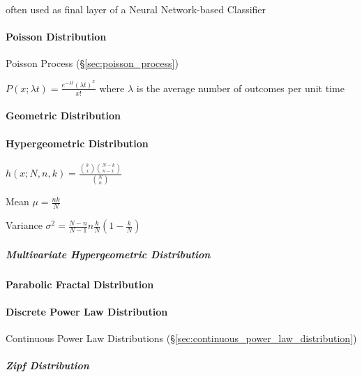 often used as final layer of a Neural Network-based Classifier



\paragraph{Poisson Distribution}\label{sec:poisson_distribution}\hfill

Poisson Process (\S\ref{sec:poisson_process})

$P(x; \lambda t) = \frac{e^{-\lambda t} (\lambda t)^x}{x!}$
where $\lambda$ is the average number of outcomes per unit time



\paragraph{Geometric Distribution}\label{sec:geometric_distribution}
\hfill

\paragraph{Hypergeometric Distribution}\hfill
\label{sec:hypergeometric_distribution}

$h(x; N, n, k) = \frac{\binom{k}{x} \binom{N-k}{n-x}}{\binom{N}{n}}$

Mean $\mu = \frac{nk}{N}$

Variance $\sigma^2 = \frac{N-n}{N-1} n \frac{k}{N}(1 - \frac{k}{N})$



\subparagraph{Multivariate Hypergeometric Distribution}\hfill
\label{sec:multivariate_hypergeometric}



\paragraph{Parabolic Fractal Distribution}
\label{sec:parabolic_fractal_distribution}\hfill

\paragraph{Discrete Power Law Distribution}
\label{sec:discrete_power_law_distribution}\hfill

\fist Continuous Power Law Distributions
(\S\ref{sec:continuous_power_law_distribution})



\subparagraph{Zipf Distribution}\label{sec:zipf_distribution}\hfill


